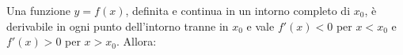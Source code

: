 Una funzione $y=f(x)$, definita e continua in un intorno completo di $x_0$, 
è derivabile in ogni punto dell’intorno
tranne in $x_0$ e vale $f'(x)<0$ per $x<x_0$ e $f'(x)>0$ per $x>x_0$. Allora:
